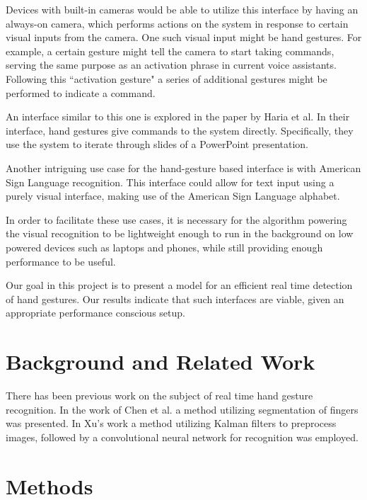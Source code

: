 \documentclass[10pt,twocolumn,letterpaper]{article}
\begin{document}
Devices with built-in cameras would be able to utilize this interface by having an always-on camera, which performs actions on the system in response to certain visual inputs from the camera. One such visual input might be hand gestures. For example, a certain gesture might tell the camera to start taking commands, serving the same purpose as an activation phrase in current voice assistants. Following this ``activation gesture" a series of additional gestures might be performed to indicate a command.

An interface similar to this one is explored in the paper by Haria et al. \cite{Haria17} In their interface, hand gestures give commands to the system directly. Specifically, they use the system to iterate through slides of a PowerPoint presentation.

Another intriguing use case for the hand-gesture based interface is with American Sign Language recognition. This interface could allow for text input using a purely visual interface, making use of the American Sign Language alphabet.

In order to facilitate these use cases, it is necessary for the algorithm powering the visual recognition to be lightweight enough to run in the background on low powered devices such as laptops and phones, while still providing enough performance to be useful.

Our goal in this project is to present a model for an efficient real time detection of hand gestures. Our results indicate that such interfaces are viable, given an appropriate performance conscious setup.


\section{Background and Related Work}

There has been previous work on the subject of real time hand gesture recognition. In the work of Chen et al. \cite{Chen14} a method utilizing segmentation of fingers was presented. In Xu's work \cite{Xu17} a method utilizing Kalman filters to preprocess images, followed by a convolutional neural network for recognition was employed. 

\section{Methods}
\end{document}
